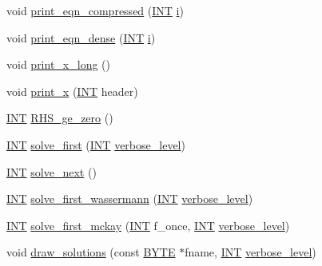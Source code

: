 \begin{DoxyCompactItemize}
\item 
void \mbox{\hyperlink{classdiophant_a49b31b969e9b19517f318af90b77be8d}{print\+\_\+eqn\+\_\+compressed}} (\mbox{\hyperlink{galois_8h_a09fddde158a3a20bd2dcadb609de11dc}{I\+NT}} \mbox{\hyperlink{alphabet2_8_c_acb559820d9ca11295b4500f179ef6392}{i}})
\item 
void \mbox{\hyperlink{classdiophant_a09da07aa31ff5acc4d94ae5b48b42f35}{print\+\_\+eqn\+\_\+dense}} (\mbox{\hyperlink{galois_8h_a09fddde158a3a20bd2dcadb609de11dc}{I\+NT}} \mbox{\hyperlink{alphabet2_8_c_acb559820d9ca11295b4500f179ef6392}{i}})
\item 
void \mbox{\hyperlink{classdiophant_a57c02064daec97a48d8240fb695f778a}{print\+\_\+x\+\_\+long}} ()
\item 
void \mbox{\hyperlink{classdiophant_a0a0960d96500c35a1632c507925dbe6e}{print\+\_\+x}} (\mbox{\hyperlink{galois_8h_a09fddde158a3a20bd2dcadb609de11dc}{I\+NT}} header)
\item 
\mbox{\hyperlink{galois_8h_a09fddde158a3a20bd2dcadb609de11dc}{I\+NT}} \mbox{\hyperlink{classdiophant_a9615d4b9f738aa4b829d2a785b52b1eb}{R\+H\+S\+\_\+ge\+\_\+zero}} ()
\item 
\mbox{\hyperlink{galois_8h_a09fddde158a3a20bd2dcadb609de11dc}{I\+NT}} \mbox{\hyperlink{classdiophant_accea09665d6f34e067c8f73452ca4ec0}{solve\+\_\+first}} (\mbox{\hyperlink{galois_8h_a09fddde158a3a20bd2dcadb609de11dc}{I\+NT}} \mbox{\hyperlink{simeon_8_c_a818073fbcc2f439e7c56952f67386122}{verbose\+\_\+level}})
\item 
\mbox{\hyperlink{galois_8h_a09fddde158a3a20bd2dcadb609de11dc}{I\+NT}} \mbox{\hyperlink{classdiophant_a826edbf2ffd604dcecf745795e9c4cac}{solve\+\_\+next}} ()
\item 
\mbox{\hyperlink{galois_8h_a09fddde158a3a20bd2dcadb609de11dc}{I\+NT}} \mbox{\hyperlink{classdiophant_a92637742ec81ffe4d613c355e40bd135}{solve\+\_\+first\+\_\+wassermann}} (\mbox{\hyperlink{galois_8h_a09fddde158a3a20bd2dcadb609de11dc}{I\+NT}} \mbox{\hyperlink{simeon_8_c_a818073fbcc2f439e7c56952f67386122}{verbose\+\_\+level}})
\item 
\mbox{\hyperlink{galois_8h_a09fddde158a3a20bd2dcadb609de11dc}{I\+NT}} \mbox{\hyperlink{classdiophant_ab4160d5e696a1f7b4180b06c2f0f9329}{solve\+\_\+first\+\_\+mckay}} (\mbox{\hyperlink{galois_8h_a09fddde158a3a20bd2dcadb609de11dc}{I\+NT}} f\+\_\+once, \mbox{\hyperlink{galois_8h_a09fddde158a3a20bd2dcadb609de11dc}{I\+NT}} \mbox{\hyperlink{simeon_8_c_a818073fbcc2f439e7c56952f67386122}{verbose\+\_\+level}})
\item 
void \mbox{\hyperlink{classdiophant_a8e989d6326b38c47975378c4004b3f5f}{draw\+\_\+solutions}} (const \mbox{\hyperlink{galois_8h_ab6cc7b4aeb6ea31aba2b3fbfc83ff5e6}{B\+Y\+TE}} $\ast$fname, \mbox{\hyperlink{galois_8h_a09fddde158a3a20bd2dcadb609de11dc}{I\+NT}} \mbox{\hyperlink{simeon_8_c_a818073fbcc2f439e7c56952f67386122}{verbose\+\_\+level}})

\end{DoxyCompactItemize}
